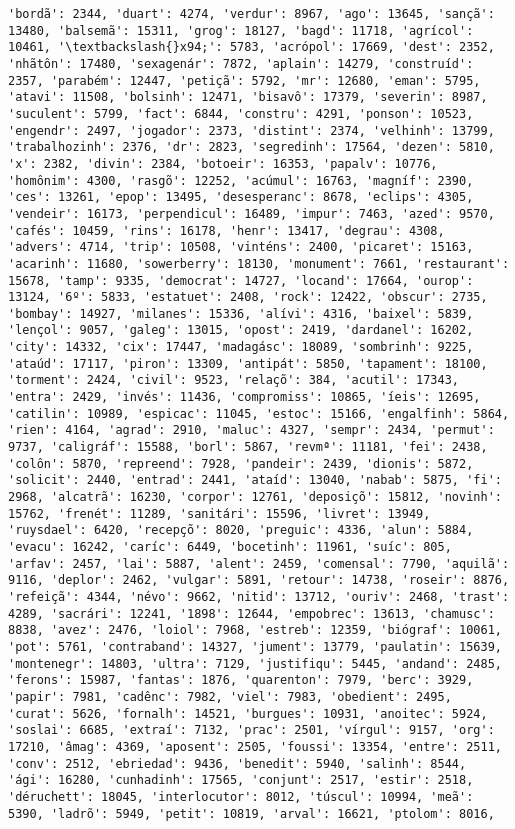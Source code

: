 \documentclass[11pt]{article}
\begin{document}
\begin{Verbatim}[commandchars=\\\{\}]
'bordã': 2344, 'duart': 4274, 'verdur': 8967, 'ago': 13645, 'sançã': 13480, 'balsemã': 15311, 'grog': 18127, 'bagd': 11718, 'agrícol': 10461, '\textbackslash{}x94;': 5783, 'acrópol': 17669, 'dest': 2352, 'nhãtôn': 17480, 'sexagenár': 7872, 'aplain': 14279, 'construíd': 2357, 'parabém': 12447, 'petiçã': 5792, 'mr': 12680, 'eman': 5795, 'atavi': 11508, 'bolsinh': 12471, 'bisavô': 17379, 'severin': 8987, 'suculent': 5799, 'fact': 6844, 'constru': 4291, 'ponson': 10523, 'engendr': 2497, 'jogador': 2373, 'distint': 2374, 'velhinh': 13799, 'trabalhozinh': 2376, 'dr': 2823, 'segredinh': 17564, 'dezen': 5810, 'x': 2382, 'divin': 2384, 'botoeir': 16353, 'papalv': 10776, 'homônim': 4300, 'rasgõ': 12252, 'acúmul': 16763, 'magníf': 2390, 'ces': 13261, 'epop': 13495, 'desesperanc': 8678, 'eclips': 4305, 'vendeir': 16173, 'perpendicul': 16489, 'impur': 7463, 'azed': 9570, 'cafés': 10459, 'rins': 16178, 'henr': 13417, 'degrau': 4308, 'advers': 4714, 'trip': 10508, 'vinténs': 2400, 'picaret': 15163, 'acarinh': 11680, 'sowerberry': 18130, 'monument': 7661, 'restaurant': 15678, 'tamp': 9335, 'democrat': 14727, 'locand': 17664, 'ourop': 13124, '6º': 5833, 'estatuet': 2408, 'rock': 12422, 'obscur': 2735, 'bombay': 14927, 'milanes': 15336, 'alívi': 4316, 'baixel': 5839, 'lençol': 9057, 'galeg': 13015, 'opost': 2419, 'dardanel': 16202, 'city': 14332, 'cix': 17447, 'madagásc': 18089, 'sombrinh': 9225, 'ataúd': 17117, 'piron': 13309, 'antipát': 5850, 'tapament': 18100, 'torment': 2424, 'civil': 9523, 'relaçõ': 384, 'acutil': 17343, 'entra': 2429, 'invés': 11436, 'compromiss': 10865, 'íeis': 12695, 'catilin': 10989, 'espicac': 11045, 'estoc': 15166, 'engalfinh': 5864, 'rien': 4164, 'agrad': 2910, 'maluc': 4327, 'sempr': 2434, 'permut': 9737, 'caligráf': 15588, 'borl': 5867, 'revmª': 11181, 'fei': 2438, 'colôn': 5870, 'repreend': 7928, 'pandeir': 2439, 'dionis': 5872, 'solicit': 2440, 'entrad': 2441, 'ataíd': 13040, 'nabab': 5875, 'fi': 2968, 'alcatrã': 16230, 'corpor': 12761, 'deposiçõ': 15812, 'novinh': 15762, 'frenét': 11289, 'sanitári': 15596, 'livret': 13949, 'ruysdael': 6420, 'recepçõ': 8020, 'preguic': 4336, 'alun': 5884, 'evacu': 16242, 'caríc': 6449, 'bocetinh': 11961, 'suíc': 805, 'arfav': 2457, 'lai': 5887, 'alent': 2459, 'comensal': 7790, 'aquilã': 9116, 'deplor': 2462, 'vulgar': 5891, 'retour': 14738, 'roseir': 8876, 'refeiçã': 4344, 'névo': 9662, 'nitid': 13712, 'ouriv': 2468, 'trast': 4289, 'sacrári': 12241, '1898': 12644, 'empobrec': 13613, 'chamusc': 8838, 'avez': 2476, 'loiol': 7968, 'estreb': 12359, 'biógraf': 10061, 'pot': 5761, 'contraband': 14327, 'jument': 13779, 'paulatin': 15639, 'montenegr': 14803, 'ultra': 7129, 'justifiqu': 5445, 'andand': 2485, 'ferons': 15987, 'fantas': 1876, 'quarenton': 7979, 'berc': 3929, 'papir': 7981, 'cadênc': 7982, 'viel': 7983, 'obedient': 2495, 'curat': 5626, 'fornalh': 14521, 'burgues': 10931, 'anoitec': 5924, 'soslai': 6685, 'extraí': 7132, 'prac': 2501, 'vírgul': 9157, 'org': 17210, 'âmag': 4369, 'aposent': 2505, 'foussi': 13354, 'entre': 2511, 'conv': 2512, 'ebriedad': 9436, 'benedit': 5940, 'salinh': 8544, 'ági': 16280, 'cunhadinh': 17565, 'conjunt': 2517, 'estir': 2518, 'déruchett': 18045, 'interlocutor': 8012, 'túscul': 10994, 'meã': 5390, 'ladrõ': 5949, 'petit': 10819, 'arval': 16621, 'ptolom': 8016, 
\end{Verbatim}
\end{document}
